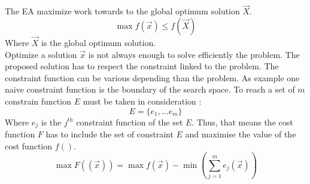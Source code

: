 The EA maximize work towards to the global optimum solution $\vec{X}$.
\begin{equation}
	\max f(\vec{x})\leq f(\vec{X})
\end{equation}
 Where  $\vec{X}$ is the global optimum solution. \\
Optimize a solution $\vec{x}$ is not always enough to solve efficiently the problem. 
The proposed solution has to respect the constraint linked to the problem. The constraint function can be various depending than the problem. As example one naive constraint function is the boundary of the search space. To reach a set of $m$ constrain function $E$ must be taken in consideration :
\begin{equation}
	E= \{e_1,...e_m \} 
\end{equation}
Where $e_j$ is the $j^{th}$ constraint function of the set $E$. %
Thus, that means the cost function $F$ has to include  the set of constraint $E$ and maximise the value of the cost function $f()$.
\begin{equation}
	\max F((\vec{x}))= \max f(\vec{x}) - \min (\sum^{m}_{j=1} e_j(\vec{x} ) )  
\end{equation}

